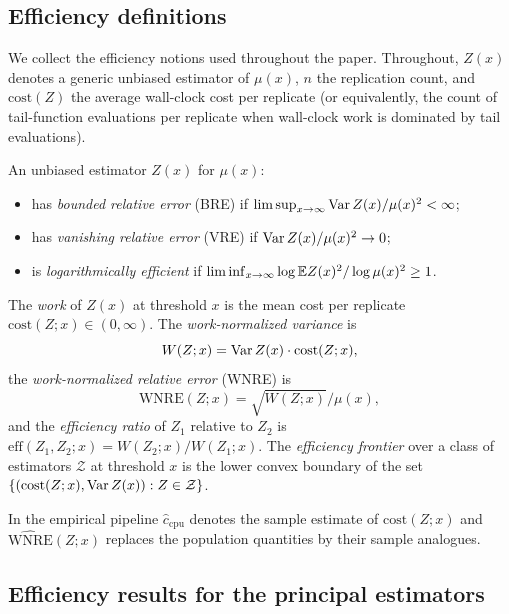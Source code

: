 \subsection{Efficiency definitions}

We collect the efficiency notions used throughout the paper. Throughout,
\(Z(x)\) denotes a generic unbiased estimator of \(\mu(x)\), \(n\) the
replication count, and \(\mathrm{cost}(Z)\) the average wall-clock cost per
replicate (or equivalently, the count of tail-function evaluations per
replicate when wall-clock work is dominated by tail evaluations).

\begin{definition}
\label{def:efficiency-notions}
An unbiased estimator $Z(x)$ for $\mu(x)$:
\begin{itemize}
\item has \emph{bounded relative error} (BRE) if
  $\limsup_{x\to\infty}\operatorname{Var} Z(x)/\mu(x)^2<\infty$;
\item has \emph{vanishing relative error} (VRE) if
  $\operatorname{Var} Z(x)/\mu(x)^2\to 0$;
\item is \emph{logarithmically efficient} if
  $\liminf_{x\to\infty}\log\mathbb{E} Z(x)^2/\log\mu(x)^2\ge 1$.
\end{itemize}
\end{definition}

\begin{definition}
\label{def:work-normalized}
The \emph{work} of $Z(x)$ at threshold $x$ is the mean cost per replicate
$\mathrm{cost}(Z;x)\in(0,\infty)$. The \emph{work-normalized variance} is
\[
  W(Z;x)=\operatorname{Var} Z(x)\cdot\mathrm{cost}(Z;x),
\]
the \emph{work-normalized relative error} (WNRE) is
\[
  \mathrm{WNRE}(Z;x)=\sqrt{W(Z;x)}/\mu(x),
\]
and the \emph{efficiency ratio} of $Z_1$ relative to $Z_2$ is
$\mathrm{eff}(Z_1,Z_2;x)=W(Z_2;x)/W(Z_1;x)$. The \emph{efficiency frontier}
over a class of estimators $\mathcal{Z}$ at threshold $x$ is the lower convex
boundary of the set $\{(\mathrm{cost}(Z;x),\operatorname{Var} Z(x)):Z\in\mathcal{Z}\}$.
\end{definition}

In the empirical pipeline $\widehat{c}_{\mathrm{cpu}}$ denotes the sample
estimate of $\mathrm{cost}(Z;x)$ and $\widehat{\mathrm{WNRE}}(Z;x)$ replaces
the population quantities by their sample analogues.

\subsection{Efficiency results for the principal estimators}
\label{subsec:efficiency-propositions}

